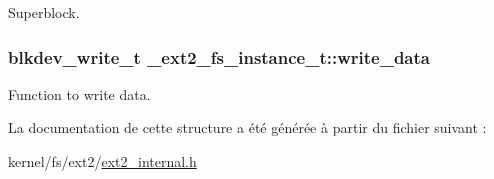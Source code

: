 Superblock. \hypertarget{struct__ext2__fs__instance__t_a90d334c34e9aeea01be13fe1ed66ba7b}{
\subsubsection[{write\+\_\+data}]{\setlength{\rightskip}{0pt plus 5cm}blkdev\+\_\+write\+\_\+t \+\_\+ext2\+\_\+fs\+\_\+instance\+\_\+t\+::write\+\_\+data}}\label{struct__ext2__fs__instance__t_a90d334c34e9aeea01be13fe1ed66ba7b}
Function to write data. 

La documentation de cette structure a été générée à partir du fichier suivant \+:\begin{DoxyCompactItemize}
\item 
kernel/fs/ext2/\hyperlink{ext2__internal_8h}{ext2\+\_\+internal.\+h}\end{DoxyCompactItemize}
